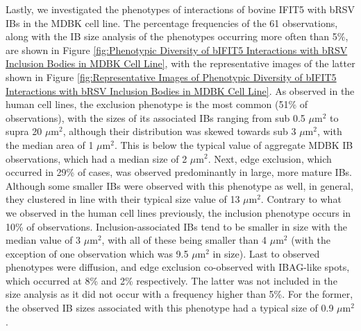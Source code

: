 Lastly, we investigated the phenotypes of interactions of bovine IFIT5 with bRSV IBs in the MDBK cell line. The percentage frequencies of the 61 observations, along with the IB size analysis of the phenotypes occurring more often than 5\%, are shown in Figure \ref{fig:Phenotypic Diversity of bIFIT5 Interactions with bRSV Inclusion Bodies in MDBK Cell Line}, with the representative images of the latter shown in Figure \ref{fig:Representative Images of Phenotypic Diversity of bIFIT5 Interactions with bRSV Inclusion Bodies in MDBK Cell Line}. As observed in the human cell lines, the exclusion phenotype is the most common (51\% of observations), with the sizes of its associated IBs ranging from sub 0.5 \(\mu \mbox{m}^2\) to supra 20 \(\mu \mbox{m}^2\), although their distribution was skewed towards sub 3 \(\mu \mbox{m}^2\), with the median area of 1 \(\mu \mbox{m}^2\). This is below the typical value of aggregate MDBK IB observations, which had a median size of 2 \(\mu \mbox{m}^2\). Next, edge exclusion, which occurred in 29\% of cases, was observed predominantly in large, more mature IBs. Although some smaller IBs were observed with this phenotype as well, in general, they clustered in line with their typical size value of 13 \(\mu \mbox{m}^2\). Contrary to what we observed in the human cell lines previously, the inclusion phenotype occurs in 10\% of observations. Inclusion-associated IBs tend to be smaller in size with the median value of 3 \(\mu \mbox{m}^2\), with all of these being smaller than 4 \(\mu \mbox{m}^2\) (with the exception of one observation which was 9.5 \(\mu \mbox{m}^2\) in size). Last to observed phenotypes were diffusion, and edge exclusion co-observed with IBAG-like spots, which occurred at 8\% and 2\% respectively. The latter was not included in the size analysis as it did not occur with a frequency higher than 5\%. For the former, the observed IB sizes associated with this phenotype had a typical size of 0.9 \(\mu \mbox{m}^2\).

